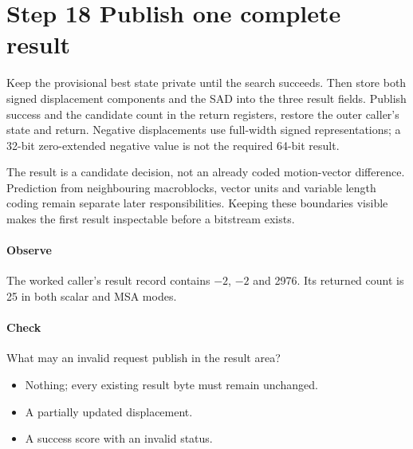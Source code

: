 \section{Step 18 Publish one complete result}\label{h263-motion-s08}
Keep the provisional best state private until the search succeeds. Then store
both signed displacement components and the SAD into the three result fields.
Publish success and the candidate count in the return registers, restore the
outer caller's state and return. Negative displacements use full-width signed
representations; a 32-bit zero-extended negative value is not the required
64-bit result.

The result is a candidate decision, not an already coded motion-vector
difference. Prediction from neighbouring macroblocks, vector units and variable
length coding remain separate later responsibilities. Keeping these boundaries
visible makes the first result inspectable before a bitstream exists.

\paragraph{Observe} The worked caller's result record contains $-2$, $-2$ and
2976. Its returned count is 25 in both scalar and MSA modes.
\paragraph{Check} What may an invalid request publish in the result area?
\begin{itemize}
  \item[A.] Nothing; every existing result byte must remain unchanged.
  \item[B.] A partially updated displacement.
  \item[C.] A success score with an invalid status.
\end{itemize}
